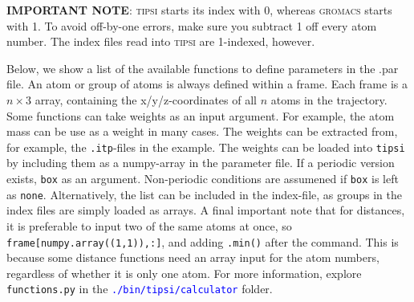 \documentclass[]{article}
\begin{document}
\textbf{IMPORTANT NOTE}: \textsc{tipsi} starts its index with 0, whereas \textsc{gromacs} starts with 1. To avoid off-by-one errors, make sure you subtract 1 off every atom number. The index files read into \textsc{tipsi} are 1-indexed, however.

Below, we show a list of the available functions to define parameters in the .par file. An atom or group of atoms is always defined within a frame. 
Each frame is a $n \times 3$ array, containing the x/y/z-coordinates of all $n$ atoms in the trajectory. 
Some functions can take weights as an input argument. For example, the atom mass can be use as a weight in many cases.
The weights can be extracted from, for example, the \texttt{.itp}-files in the example.
The weights can be loaded into \texttt{tipsi} by including them as a numpy-array in the parameter file. 
If a periodic version exists, \texttt{box} as an argument. Non-periodic conditions are assumened if \texttt{box} is left as \texttt{none}.
Alternatively, the list can be included in the index-file, as groups in the index files are simply loaded as arrays.
A final important note that for distances, it is preferable to input two of the same atoms at once, so \texttt{frame[numpy.array((1,1)),:]}, and adding \texttt{.min()} after the command.
This is because some distance functions need an array input for the atom numbers, regardless of whether it is only one atom.
For more information, explore \texttt{functions.py} in the \textcolor{blue}{\texttt{./bin/tipsi/calculator}} folder.
\end{document}
